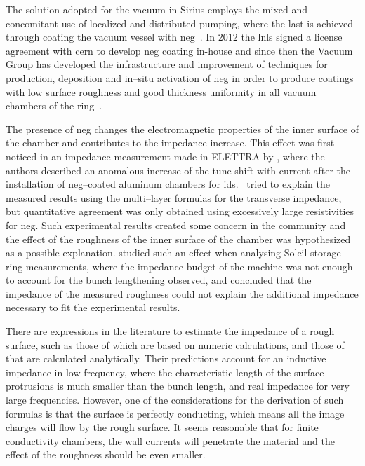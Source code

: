     The solution adopted for the vacuum in Sirius employs the mixed and concomitant use of localized and distributed pumping, where the last is achieved through coating the vacuum vessel with \gls{neg}~\cite{Benvenuti1998,Prodromides2002}. In 2012 the \gls{lnls} signed a license agreement with \gls{cern} to develop \gls{neg} coating in-house and since then the Vacuum Group has developed the infrastructure and improvement of techniques for production, deposition and in--situ activation of \gls{neg} in order to produce coatings with low surface roughness and good thickness uniformity in all vacuum chambers of the ring~\cite{Seraphim2015,Rocha2017}.

    The presence of \gls{neg} changes the electromagnetic properties of the inner surface of the chamber and contributes to the impedance increase. This effect was first noticed in an impedance measurement made in ELETTRA by , where the authors described an anomalous increase of the tune shift with current after the installation of \gls{neg}--coated aluminum chambers for \glspl{id}.~ tried to explain the measured results using the multi--layer formulas for the transverse impedance, but quantitative agreement was only obtained using excessively large resistivities for \gls{neg}. Such experimental results created some concern in the community and the effect of the roughness of the inner surface of the chamber was hypothesized as a possible explanation.  studied such an effect when analysing Soleil storage ring measurements, where the impedance budget of the machine was not enough to account for the bunch lengthening observed, and concluded that the impedance of the measured roughness could not explain the additional impedance necessary to fit the experimental results.

    There are expressions in the literature to estimate the impedance of a rough surface, such as those of  which are based on numeric calculations, and those of  that are calculated analytically. Their predictions account for an inductive impedance in low frequency, where the characteristic length of the surface protrusions is much smaller than the bunch length, and real impedance for very large frequencies. However, one of the considerations for the derivation of such formulas is that the surface is perfectly conducting, which means all the image charges will flow by the rough surface. It seems reasonable that for finite conductivity chambers, the wall currents will penetrate the material and the effect of the roughness should be even smaller.

